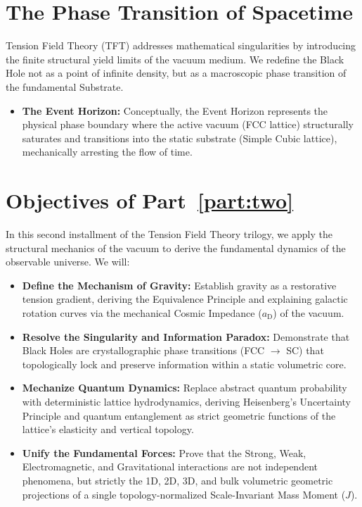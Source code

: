 \section{The Phase Transition of Spacetime}
Tension Field Theory (TFT) addresses mathematical singularities by introducing the finite structural yield limits of the vacuum medium. We redefine the Black Hole not as a point of infinite density, but as a macroscopic phase transition of the fundamental Substrate.

\begin{itemize}
    \item \textbf{The Event Horizon:} Conceptually, the Event Horizon represents the physical phase boundary where the active vacuum (FCC lattice) structurally saturates and transitions into the static substrate (Simple Cubic lattice), mechanically arresting the flow of time.
\end{itemize}

\section{Objectives of Part~\ref{part:two}}
In this second installment of the Tension Field Theory trilogy, we apply the structural mechanics of the vacuum to derive the fundamental dynamics of the observable universe. We will:

\begin{itemize}
    \item \textbf{Define the Mechanism of Gravity:} Establish gravity as a restorative tension gradient, deriving the Equivalence Principle and explaining galactic rotation curves via the mechanical Cosmic Impedance ($a_{\mathrm{D}}$) of the vacuum.
    \item \textbf{Resolve the Singularity and Information Paradox:} Demonstrate that Black Holes are crystallographic phase transitions (FCC $\to$ SC) that topologically lock and preserve information within a static volumetric core.
    \item \textbf{Mechanize Quantum Dynamics:} Replace abstract quantum probability with deterministic lattice hydrodynamics, deriving Heisenberg's Uncertainty Principle and quantum entanglement as strict geometric functions of the lattice's elasticity and vertical topology.
    \item \textbf{Unify the Fundamental Forces:} Prove that the Strong, Weak, Electromagnetic, and Gravitational interactions are not independent phenomena, but strictly the 1D, 2D, 3D, and bulk volumetric geometric projections of a single topology-normalized Scale-Invariant Mass Moment ($\hat{J}$).
\end{itemize}